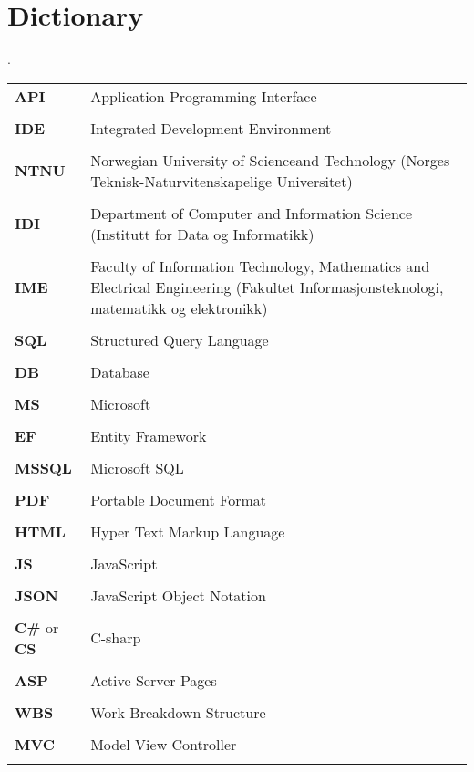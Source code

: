 \section{Dictionary}.
\begin{longtable}{l p{10cm}}
\textbf{API} & Application Programming Interface\\\\
\textbf{IDE} & Integrated Development Environment\\\\
\textbf{NTNU} & Norwegian University of Scienceand Technology (Norges Teknisk-Naturvitenskapelige Universitet)\\\\
\textbf{IDI} & Department of Computer and Information Science (Institutt for Data og Informatikk)\\\\
\textbf{IME} & Faculty of Information Technology, Mathematics and Electrical Engineering (Fakultet Informasjonsteknologi, matematikk og elektronikk)\\\\
\textbf{SQL} & Structured Query Language\\\\
\textbf{DB} & Database\\\\
\textbf{MS} & Microsoft\\\\
\textbf{EF} & Entity Framework\\\\
\textbf{MSSQL} & Microsoft SQL\\\\
\textbf{PDF} & Portable Document Format\\\\
\textbf{HTML} & Hyper Text Markup Language\\\\
\textbf{JS} & JavaScript\\\\
\textbf{JSON }& JavaScript Object Notation\\\\
\textbf{C\#} or \textbf{CS} & C-sharp\\\\
\textbf{ASP} & Active Server Pages\\\\
\textbf{WBS} & Work Breakdown Structure\\\\
\textbf{MVC} & Model View Controller\\\\

\end{longtable}
